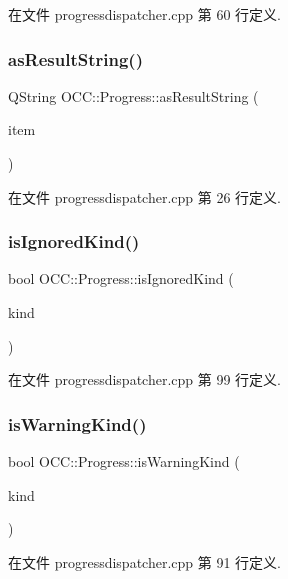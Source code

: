 在文件 progressdispatcher.\+cpp 第 60 行定义.

\mbox{\label{namespace_o_c_c_1_1_progress_a24146df35bdf4407599447bf00db46f9}} 
\subsubsection{\texorpdfstring{as\+Result\+String()}{asResultString()}}
{\footnotesize\ttfamily Q\+String O\+C\+C\+::\+Progress\+::as\+Result\+String (\begin{DoxyParamCaption}\item[{const \hyperlink{class_o_c_c_1_1_sync_file_item}{Sync\+File\+Item} \&}]{item }\end{DoxyParamCaption})}



在文件 progressdispatcher.\+cpp 第 26 行定义.

\mbox{\label{namespace_o_c_c_1_1_progress_a66eb9514ab228df079a90b3d43b087f6}} 
\subsubsection{\texorpdfstring{is\+Ignored\+Kind()}{isIgnoredKind()}}
{\footnotesize\ttfamily bool O\+C\+C\+::\+Progress\+::is\+Ignored\+Kind (\begin{DoxyParamCaption}\item[{\hyperlink{class_o_c_c_1_1_sync_file_item_a149ade86eddd9661587bfbc9bcbca408}{Sync\+File\+Item\+::\+Status}}]{kind }\end{DoxyParamCaption})}



在文件 progressdispatcher.\+cpp 第 99 行定义.

\mbox{\label{namespace_o_c_c_1_1_progress_a0fe4fb92db396bd94def14e4904ad0ff}} 
\subsubsection{\texorpdfstring{is\+Warning\+Kind()}{isWarningKind()}}
{\footnotesize\ttfamily bool O\+C\+C\+::\+Progress\+::is\+Warning\+Kind (\begin{DoxyParamCaption}\item[{\hyperlink{class_o_c_c_1_1_sync_file_item_a149ade86eddd9661587bfbc9bcbca408}{Sync\+File\+Item\+::\+Status}}]{kind }\end{DoxyParamCaption})}



在文件 progressdispatcher.\+cpp 第 91 行定义.

